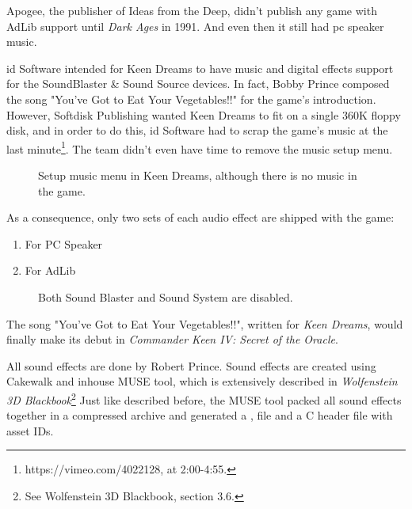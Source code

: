 \documentclass[book.tex]{subfiles}
\begin{document}
\par
{} Apogee, the publisher of Ideas from the Deep, didn't publish any game with AdLib support until \textit{Dark Ages} in 1991. And even then it still had pc speaker music.\\

\par
id Software intended for Keen Dreams to have music and digital effects support for the SoundBlaster \& Sound Source devices. In fact, Bobby Prince composed the song "You've Got to Eat Your Vegetables!!" for the game's introduction. However, Softdisk Publishing wanted Keen Dreams to fit on a single 360K floppy disk, and in order to do this, id Software had to scrap the game's music at the last minute\footnote{https://vimeo.com/4022128, at 2:00-4:55.}. The team didn't even have time to remove the music setup menu.

\begin{figure}[H]
\centering
{}
\caption{Setup music menu in Keen Dreams, although there is no music in the game.}
\end{figure}

\par
As a consequence, only two sets of each audio effect are shipped with the game:
\begin{enumerate}
\item For PC Speaker
\item For AdLib
\end{enumerate}

\begin{figure}[H]
\centering
{}
\caption{Both Sound Blaster and Sound System are disabled.}
\end{figure}
\par

 The song "You've Got to Eat Your Vegetables!!", written for \textit{Keen Dreams}, would finally make its debut in \textit{Commander Keen IV: Secret of the Oracle}.\\


\par
All sound effects are done by Robert Prince. Sound effects are created using Cakewalk and inhouse MUSE tool, which is  extensively described in \textit{Wolfenstein 3D Blackbook}\footnote{See Wolfenstein 3D Blackbook, section 3.6.}
Just like described before, the MUSE tool packed all sound effects together in a compressed  archive and generated a ,  file and a C header file with asset IDs.\\
\end{document}
